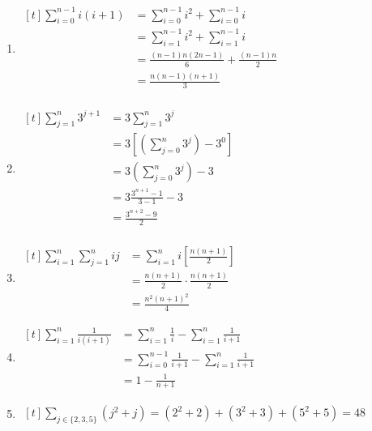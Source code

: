 \documentclass[12pt, letterpaper]{article}
\begin{document}
\begin{enumerate}
	\item $ \begin{aligned}[t]
			      \sum^{n - 1}_{i = 0} i(i + 1)
			       & = \sum^{n-1}_{i = 0} i^2 + \sum^{n - 1}_{i = 0} i \\
			       & = \sum^{n-1}_{i = 1} i^2 + \sum^{n - 1}_{i = 1} i \\
			       & = \frac{(n - 1)n(2n - 1)}{6} + \frac{(n - 1)n}{2} \\
			       & = \frac{n(n - 1)(n + 1)}{3}                       \\
		      \end{aligned} $

	\item $ \begin{aligned}[t]
			      \sum^{n}_{j = 1} 3^{j + 1}
			       & = 3\sum^{n}_{j = 1} 3^j            \\
			       & = 3[(\sum^{n}_{j = 0} 3^j) - 3^0]  \\
			       & = 3(\sum^{n}_{j = 0} 3^j) - 3      \\
			       & = 3\frac{3^{n + 1} - 1}{3 - 1} - 3 \\
			       & = \frac{3^{n + 2} - 9}{2}          \\
		      \end{aligned} $

	\item $ \begin{aligned}[t]
			      \sum^{n}_{i = 1} \sum^{n}_{j = 1} ij
			       & = \sum^{n}_{i = 1} i [\frac{n(n + 1)}{2}]     \\
			       & = \frac{n(n + 1)}{2} \cdot \frac{n(n + 1)}{2} \\
			       & = \frac{n^2{(n + 1)}^2}{4}
		      \end{aligned} $

	\item $ \begin{aligned}[t]
			      \sum^{n}_{i = 1} \frac{1}{i(i + 1)}
			       & = \sum^{n}_{i = 1} \frac{1}{i} - \sum^{n}_{i = 1} \frac{1}{i + 1}         \\
			       & = \sum^{n - 1}_{i = 0} \frac{1}{i + 1} - \sum^{n}_{i = 1} \frac{1}{i + 1} \\
			       & = 1 - \frac{1}{n + 1}
		      \end{aligned} $

	\item $ \begin{aligned}[t]
			      \sum_{j \in \{2, 3, 5\}} (j^2 + j) = (2^2 + 2) + (3^2 + 3) + (5^2 + 5) = 48
		      \end{aligned} $


\end{enumerate}
\end{document}
